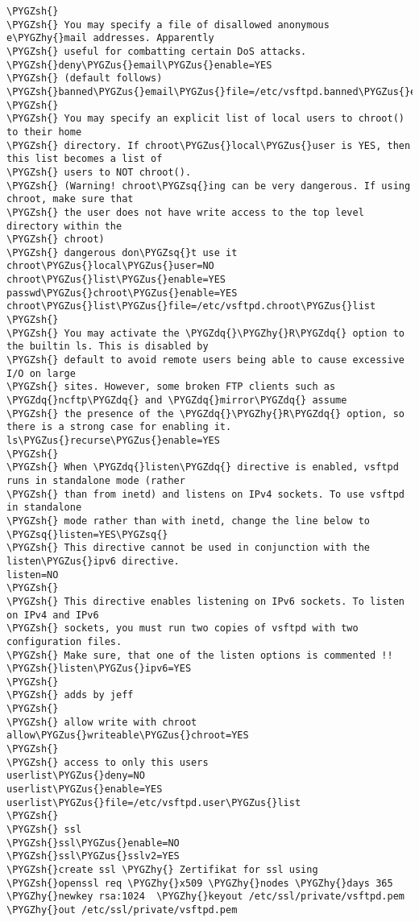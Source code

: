 \documentclass[letterpaper,10pt,english]{sphinxmanual}
\def\PYGZus{\char`\_}
\def\PYGZsh{\char`\#}
\def\PYGZhy{\char`\-}
\def\PYGZsq{\char`\'}
\def\PYGZdq{\char`\"}
\begin{document}
\begin{Verbatim}[commandchars=\\\{\}]
\PYGZsh{}
\PYGZsh{} You may specify a file of disallowed anonymous e\PYGZhy{}mail addresses. Apparently
\PYGZsh{} useful for combatting certain DoS attacks.
\PYGZsh{}deny\PYGZus{}email\PYGZus{}enable=YES
\PYGZsh{} (default follows)
\PYGZsh{}banned\PYGZus{}email\PYGZus{}file=/etc/vsftpd.banned\PYGZus{}emails
\PYGZsh{}
\PYGZsh{} You may specify an explicit list of local users to chroot() to their home
\PYGZsh{} directory. If chroot\PYGZus{}local\PYGZus{}user is YES, then this list becomes a list of
\PYGZsh{} users to NOT chroot().
\PYGZsh{} (Warning! chroot\PYGZsq{}ing can be very dangerous. If using chroot, make sure that
\PYGZsh{} the user does not have write access to the top level directory within the
\PYGZsh{} chroot)
\PYGZsh{} dangerous don\PYGZsq{}t use it
chroot\PYGZus{}local\PYGZus{}user=NO
chroot\PYGZus{}list\PYGZus{}enable=YES
passwd\PYGZus{}chroot\PYGZus{}enable=YES
chroot\PYGZus{}list\PYGZus{}file=/etc/vsftpd.chroot\PYGZus{}list
\PYGZsh{}
\PYGZsh{} You may activate the \PYGZdq{}\PYGZhy{}R\PYGZdq{} option to the builtin ls. This is disabled by
\PYGZsh{} default to avoid remote users being able to cause excessive I/O on large
\PYGZsh{} sites. However, some broken FTP clients such as \PYGZdq{}ncftp\PYGZdq{} and \PYGZdq{}mirror\PYGZdq{} assume
\PYGZsh{} the presence of the \PYGZdq{}\PYGZhy{}R\PYGZdq{} option, so there is a strong case for enabling it.
ls\PYGZus{}recurse\PYGZus{}enable=YES
\PYGZsh{}
\PYGZsh{} When \PYGZdq{}listen\PYGZdq{} directive is enabled, vsftpd runs in standalone mode (rather
\PYGZsh{} than from inetd) and listens on IPv4 sockets. To use vsftpd in standalone
\PYGZsh{} mode rather than with inetd, change the line below to \PYGZsq{}listen=YES\PYGZsq{}
\PYGZsh{} This directive cannot be used in conjunction with the listen\PYGZus{}ipv6 directive.
listen=NO
\PYGZsh{}
\PYGZsh{} This directive enables listening on IPv6 sockets. To listen on IPv4 and IPv6
\PYGZsh{} sockets, you must run two copies of vsftpd with two configuration files.
\PYGZsh{} Make sure, that one of the listen options is commented !!
\PYGZsh{}listen\PYGZus{}ipv6=YES
\PYGZsh{}
\PYGZsh{} adds by jeff
\PYGZsh{}
\PYGZsh{} allow write with chroot
allow\PYGZus{}writeable\PYGZus{}chroot=YES
\PYGZsh{}
\PYGZsh{} access to only this users
userlist\PYGZus{}deny=NO
userlist\PYGZus{}enable=YES
userlist\PYGZus{}file=/etc/vsftpd.user\PYGZus{}list
\PYGZsh{}
\PYGZsh{} ssl
\PYGZsh{}ssl\PYGZus{}enable=NO
\PYGZsh{}ssl\PYGZus{}sslv2=YES
\PYGZsh{}create ssl \PYGZhy{} Zertifikat for ssl using
\PYGZsh{}openssl req \PYGZhy{}x509 \PYGZhy{}nodes \PYGZhy{}days 365 \PYGZhy{}newkey rsa:1024  \PYGZhy{}keyout /etc/ssl/private/vsftpd.pem \PYGZhy{}out /etc/ssl/private/vsftpd.pem

\end{Verbatim}
\end{document}
